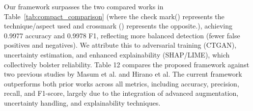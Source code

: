 \begin{table}[ht]
    \centering
    \caption{Comparison of Techniques/Aspect with Related Works}
    \label{tab:compact_comparison}
\end{table}

Our framework surpasses the two compared works in Table~\ref{tab:compact_comparison} (where the check mark(\cmark) represents the technique/aspect used and crossmark (\xmark) represents the opposite.), achieving 0.9977 accuracy and 0.9978 F1, reflecting more balanced detection (fewer false positives and negatives). We attribute this to adversarial training (CTGAN), uncertainty estimation, and enhanced explainability (SHAP/LIME),  which collectively bolster reliability. Table 12 compares the proposed framework against two previous studies by Masum et al. and Hirano et al. The current framework outperforms both prior works across all metrics, including accuracy, precision, recall, and F1-score, largely due to the integration of advanced augmentation, uncertainty handling, and explainability techniques.

